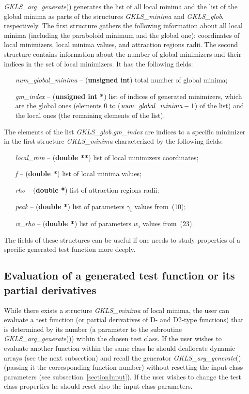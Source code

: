 \documentclass[acmtoms]{acmtrans2m}
\begin{document}
{\it GKLS\_arg\_generate}() generates the list of all local minima
and the list of the global minima as parts of the structures {\it
GKLS\_minima} and {\it GKLS\_glob}, respectively. The first
structure gathers the following information about all local minima
(including the paraboloid minimum and the global one): coordinates
of local minimizers, local minima values, and attraction regions
radii. The second structure contains information about the number
of global minimizers and their indices in the set of local
minimizers. It has the following fields:
 \begin{itemize}
  \item[\it num\_global\_minima] -- ({\bf unsigned int}) total number of
  global minima;
  \item[\it gm\_index] -- ({\bf unsigned int *}) list of indices of generated
  minimizers, which are the global ones (elements 0 to ($\mbox{\it
  num\_global\_minima} - 1$) of the list) and the local ones
  (the remaining elements of the list).
 \end{itemize}
The elements of the list {\it GKLS\_glob}.{\it gm\_index} are
indices to a specific minimizer in the first structure {\it
GKLS\_minima} characterized by the following fields:
 \begin{itemize}
  \item[\it local\_min] -- ({\bf double **}) list of local minimizers
  coordinates;
  \item[\it f] -- ({\bf double *}) list of local minima values;
  \item[\it rho] -- ({\bf double *}) list of attraction regions radii;
  \item[\it peak] -- ({\bf double *}) list of parameters $\gamma_i$ values
  from~(10);
  \item[\it w\_rho] -- ({\bf double *}) list of parameters $w_i$ values
  from~(23).
 \end{itemize}
The fields of these structures can be useful if one needs to study
properties of a specific generated test function more deeply.

\subsection{Evaluation of a generated test function or its
partial derivatives} \label{sectionEvaluation}

While there exists a structure {\it GKLS\_minima} of local minima,
the user can evaluate a test function (or partial derivatives of
D- and D2-type functions) that is determined by its number (a
parameter to the subroutine {\it GKLS\_arg\_generate}()) within
the chosen test class. If the user wishes to evaluate another
function within the same class he should deallocate dynamic arrays
(see the next subsection) and recall the generator {\it
GKLS\_arg\_generate}() (passing it the corresponding function
number) without resetting the input class parameters (see
subsection~\ref{sectionInput}). If the user wishes to change the
test class properties he should reset also the input class
parameters.
\end{document}
